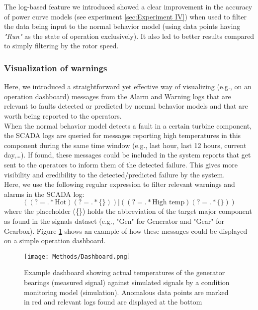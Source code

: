       The log-based feature we introduced showed a clear improvement in the accuracy of power curve models (see experiment \ref{sec:Experiment IV}) when used to filter the data being input 
      to the normal behavior model (using data points having \emph{"Run"} as the state of operation exclusively). It also led to better results compared to 
      simply filtering by the rotor speed.


    \subsubsection{Visualization of warnings}
    \label{subsub:vis_warnings}
      Here, we introduced a straightforward yet effective way of visualizing (e.g., on an operation dashboard) messages from the Alarm and Warning logs that are relevant 
      to faults detected or predicted by normal behavior models and that are worth being reported to the operators.\\
      When the normal behavior model detects a fault in a certain turbine component, the SCADA logs are queried for messages reporting high temperatures in this component 
      during the same time window (e.g., last hour, last 12 hours, current day,\dots). If found, these messages could be included in the system reports that get sent to the operators
      to inform them of the detected failure. This gives more visibility and credibility to the detected/predicted failure by the system.\\
      Here, we use the following regular expression to filter relevant warnings and alarms in the SCADA log:
      \begin{equation}
        ((?=.*\text{Hot})(?=.*\{\}))|((?=.*\text{High temp})(?=.*\{\}))
      \end{equation}
      where the placeholder (\{\}) holds the abbreviation of the target major component as found in the signals dataset 
      (e.g., "Gen" for Generator and "Gear" for Gearbox). Figure \ref{fig:dashboard} shows an example of how these messages could be displayed 
      on a simple operation dashboard.

      \begin{figure}[h]
        \begin{center}
          \texttt{[image: Methods/Dashboard.png]}
        \end{center}
        \caption{Example dashboard showing actual temperatures of the generator bearings (measured signal) against simulated signals 
        by a condition monitoring model (simulation). Anomalous data points are marked in red and relevant logs found are displayed at the bottom}
        \label{fig:dashboard}
      \end{figure}
    

